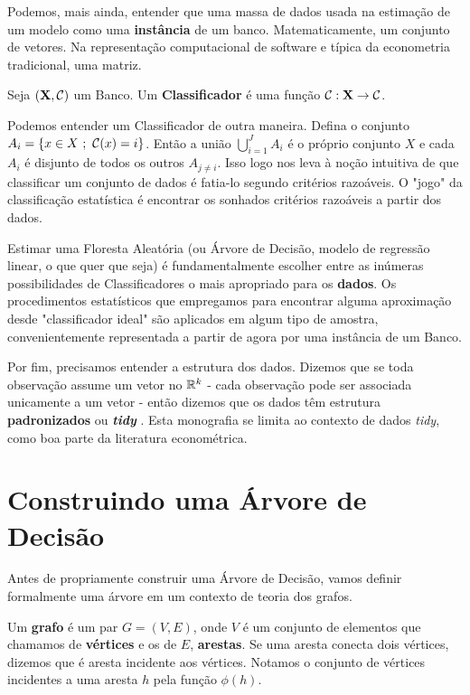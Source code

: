 Podemos, mais ainda, entender que uma massa de dados usada na estimação de um modelo como uma \textbf{instância} de um banco. Matematicamente, um conjunto de vetores. Na representação computacional de software e típica da econometria tradicional, uma matriz.


\begin{defi} Seja $(\mathbf{X}, \mathcal{C})$ um Banco. Um \textbf{Classificador} é uma função $\mathcal{C}: \mathbf{X} \to \mathcal{C}$.
\end{defi}

Podemos entender um Classificador de outra maneira. Defina o conjunto $A_i = \{ x \in X \,\, ; \,\, \mathcal{C}(x) = i\}$. Então a união $\bigcup_{i = 1}^J A_i$ é o próprio conjunto $X$ e cada $A_i$ é disjunto de todos os outros $A_{j \neq i}$. Isso logo nos leva à noção intuitiva de que classificar um conjunto de dados é fatia-lo segundo critérios razoáveis. O "jogo" da classificação estatística é encontrar os sonhados critérios razoáveis a partir dos dados.

Estimar uma Floresta Aleatória (ou Árvore de Decisão, modelo de regressão linear, o que quer que seja) é fundamentalmente escolher entre as inúmeras possibilidades de Classificadores o mais apropriado para os \textbf{dados}. Os procedimentos estatísticos que empregamos para encontrar alguma aproximação desde "classificador ideal" são aplicados em algum tipo de amostra, convenientemente representada a partir de agora por uma instância de um Banco.

Por fim, precisamos entender a estrutura dos dados. Dizemos que se toda observação assume um vetor no $\mathbb{R}^k$ - cada observação pode ser associada unicamente a um vetor - então dizemos que os dados têm estrutura \textbf{padronizados} ou \textbf{\textit{tidy}} \cite{tidyr}. Esta monografia se limita ao contexto de dados \textit{tidy}, como boa parte da literatura econométrica.

\section{Construindo uma Árvore de Decisão}

Antes de propriamente construir uma Árvore de Decisão, vamos definir formalmente uma árvore em um contexto de teoria dos grafos. 

\begin{defi}
Um \textbf{grafo} é um par $G = (V, E)$, onde $V$ é um conjunto de elementos que chamamos de \textbf{vértices} e os de $E$, \textbf{arestas}. Se uma aresta conecta dois vértices, dizemos que é aresta incidente aos vértices. Notamos o conjunto de vértices incidentes a uma aresta $h$ pela função $\phi(h)$.
\end{defi}

